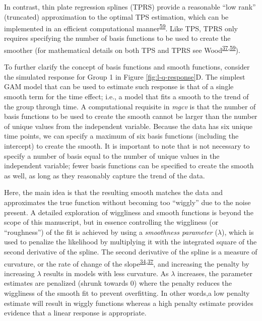 \documentclass[
]{article}
\begin{document}
In contrast, thin plate regression splines (TPRS) provide a reasonable ``low rank'' (truncated) approximation to the optimal TPS estimation, which can be implemented in an efficient computational manner\textsuperscript{\protect\hyperlink{ref-wood2003}{59}}. Like TPS, TPRS only requires specifying the number of basis functions to be used to create the smoother (for mathematical details on both TPS and TPRS see Wood\textsuperscript{\protect\hyperlink{ref-wood2017}{37},\protect\hyperlink{ref-wood2003}{59}}).

To further clarify the concept of basis functions and smooth functions, consider the simulated response for Group 1 in Figure \ref{fig:l-q-response}D. The simplest GAM model that can be used to estimate such response is that of a single smooth term for the time effect; i.e., a model that fits a smooth to the trend of the group through time. A computational requisite in \emph{mgcv} is that the number of basis functions to be used to create the smooth cannot be larger than the number of unique values from the independent variable. Because the data has six unique time points, we can specify a maximum of six basis functions (including the intercept) to create the smooth. It is important to note that is not necessary to specify a number of basis equal to the number of unique values in the independent variable; fewer basis functions can be specified to create the smooth as well, as long as they reasonably capture the trend of the data.

Here, the main idea is that the resulting smooth matches the data and approximates the true function without becoming too ``wiggly'' due to the noise present. A detailed exploration of wiggliness and smooth functions is beyond the scope of this manuscript, but in essence controlling the wiggliness (or ``roughness'') of the fit is achieved by using a \emph{smoothness parameter} (\(\lambda\)), which is used to penalize the likelihood by multiplying it with the integrated square of the second derivative of the spline. The second derivative of the spline is a measure of curvature, or the rate of change of the slope\textsuperscript{\protect\hyperlink{ref-simpson2018}{34},\protect\hyperlink{ref-wood2017}{37}}, and increasing the penalty by increasing \(\lambda\) results in models with less curvature. As \(\lambda\) increases, the parameter estimates are penalized (shrunk towards 0) where the penalty reduces the wiggliness of the smooth fit to prevent overfitting. In other words,a low penalty estimate will result in wiggly functions whereas a high penalty estimate provides evidence that a linear response is appropriate.
\end{document}
